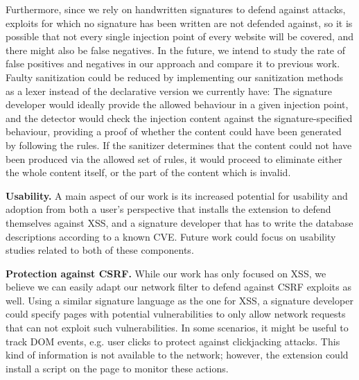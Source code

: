  Furthermore, since we rely on handwritten signatures to defend against attacks, exploits for which no signature has been written are not defended against, so it is possible that not every single injection point of every website will be covered, and there might also be false negatives. In the future, we intend to study the rate of false positives and negatives in our approach and compare it to previous work. Faulty sanitization could be reduced by implementing our sanitization methods as a lexer instead of the declarative version we currently have: The signature developer would ideally provide the allowed behaviour in a given injection point, and the detector would check the injection content against the signature-specified behaviour, providing a proof of whether the content could have been generated by following the rules. If the sanitizer determines that the content could not have been produced via the allowed set of rules, it would proceed to eliminate either the whole content itself, or the part of the content which is invalid.

\textbf{Usability.} A main aspect of our work is its increased potential for usability and adoption from both a user's perspective that installs the extension to defend themselves against \ac{XSS}, and a signature developer that has to write the database descriptions according to a known CVE. Future work could focus on usability studies related to both of these components.

\textbf{Protection against CSRF.} While our work has only focused on \ac{XSS}, we believe we can easily adapt our network filter to defend against CSRF exploits as well. Using a similar signature language as the one for \ac{XSS}, a signature developer could specify pages with potential vulnerabilities to only allow network requests that can not exploit such vulnerabilities. In some scenarios, it might be useful to track DOM events, e.g. user clicks to protect against clickjacking attacks. This kind of information is not available to the network; however, the extension could install a script on the page to monitor these actions. 

